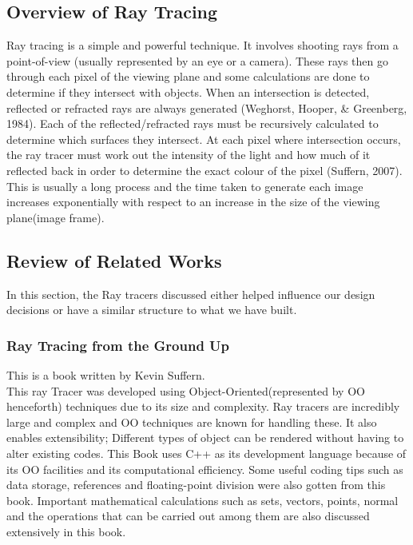 \documentclass[a4paper]{article}
\begin{document}
	\subsection{Overview of Ray Tracing}
	\par Ray tracing is a simple and powerful technique. It involves shooting rays from a point-of-view (usually represented by an eye or a camera). These rays then go through each pixel of the viewing plane and some calculations are done to determine if they intersect with objects. When an intersection is detected, reflected or refracted rays are always generated (Weghorst, Hooper, \& Greenberg, 1984). Each of the reflected/refracted rays must be recursively calculated to determine which surfaces they intersect. At each pixel where intersection occurs, the ray tracer must work out the intensity of the light and how much of it reflected back in order to determine the exact colour of the pixel (Suffern, 2007). This is usually a long process and the time taken to generate each image increases exponentially with respect to an increase in the size of the viewing plane(image frame).\\
	
	\subsection{Review of Related Works}
	\par In this section, the Ray tracers discussed either helped influence our design decisions or have a similar structure to what we have built.
	\subsubsection{Ray Tracing from the Ground Up}
	\label{sssec:book}
	\par This is a book written by Kevin Suffern.\\
	
	This ray Tracer was developed using Object-Oriented(represented by OO henceforth) techniques due to its size and complexity. Ray tracers are incredibly large and complex and OO techniques are known for handling these. It also enables extensibility; Different types of object can be rendered without having to alter existing codes. This Book uses C++ as its development language because of its OO facilities and its computational efficiency. Some useful coding tips such as data storage, references and floating-point division were also gotten from this book. Important mathematical calculations such as sets, vectors, points, normal and the operations that can be carried out among them are also discussed extensively in this book.\\
	
\end{document}
